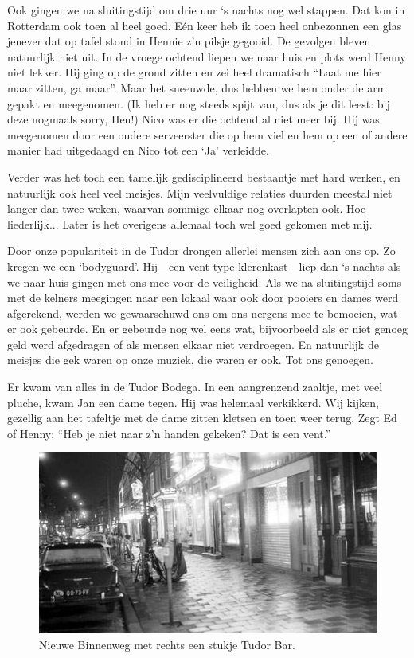 \documentclass[12pt,twoside, openright]{memoir}
\begin{document}
Ook gingen we na sluitingstijd om drie uur `s nachts nog wel stappen. Dat kon in Rotterdam ook toen al heel goed. Eén keer heb ik toen heel onbezonnen een glas jenever dat op tafel stond in Hennie z'n pilsje gegooid. De gevolgen bleven natuurlijk niet uit. In de vroege ochtend liepen we naar huis en plots werd Henny niet lekker. Hij ging op de grond zitten en zei heel dramatisch ``Laat me hier maar zitten, ga maar''. Maar het sneeuwde, dus hebben we hem onder de arm gepakt en meegenomen. (Ik heb er nog steeds spijt van, dus als je dit leest: bij deze nogmaals sorry, Hen!) Nico was er die ochtend al niet meer bij. Hij was meegenomen door een oudere serveerster die op hem viel en hem op een of andere manier had uitgedaagd en Nico tot een `Ja' verleidde.

Verder was het toch een tamelijk gedisciplineerd bestaantje met hard werken, en natuurlijk ook heel veel meisjes. Mijn veelvuldige relaties duurden meestal niet langer dan twee weken, waarvan sommige elkaar nog overlapten ook. Hoe liederlijk... Later is het overigens allemaal toch wel goed gekomen met mij. 

Door onze populariteit in de Tudor drongen allerlei mensen zich aan ons op. Zo kregen we een `bodyguard'. Hij---een vent type klerenkast---liep dan `s nachts als we naar huis gingen met ons mee voor de veiligheid. Als we na sluitingstijd soms met de kelners meegingen naar een lokaal waar ook door pooiers en dames werd afgerekend, werden we gewaarschuwd ons om ons nergens mee te bemoeien, wat er ook gebeurde. En er gebeurde nog wel eens wat, bijvoorbeeld als er niet genoeg geld werd afgedragen of als mensen elkaar niet verdroegen. En natuurlijk de meisjes die gek waren op onze muziek, die waren er ook. Tot ons genoegen. 

Er kwam van alles in de Tudor Bodega. In een aangrenzend zaaltje, met veel pluche, kwam Jan een dame tegen. Hij was helemaal verkikkerd. Wij kijken, gezellig aan het tafeltje met de dame zitten kletsen en toen weer terug. Zegt Ed of Henny: ``Heb je niet naar z’n handen gekeken? Dat is een vent.'' 

\begin{figure}
\includegraphics[width=\textwidth]{img/ch28/tudor}
\caption*{\footnotesize Nieuwe Binnenweg met rechts een stukje Tudor Bar.}
\end{figure}
\end{document}
